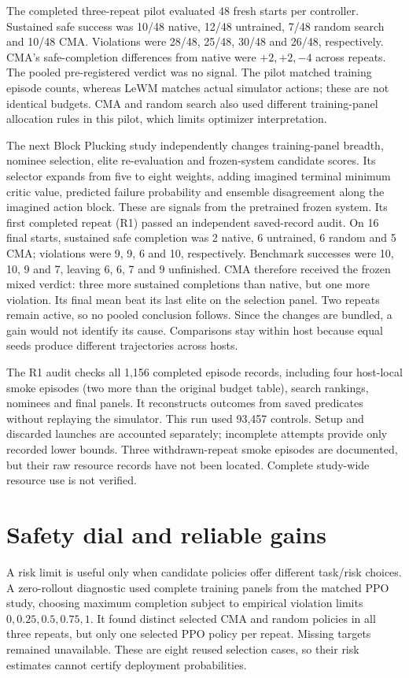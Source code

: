 \documentclass[sigconf,nonacm]{acmart}
\begin{document}
The completed three-repeat pilot evaluated 48 fresh starts per controller.
Sustained safe success was 10/48 native, 12/48 untrained, 7/48 random search and
10/48 CMA. Violations were 28/48, 25/48, 30/48 and 26/48, respectively. CMA's
safe-completion differences from native were $+2,+2,-4$ across repeats. The pooled
pre-registered verdict was no signal. The pilot matched training episode counts,
whereas LeWM matches actual simulator actions; these are not identical budgets.
CMA and random search also used different training-panel allocation rules in this
pilot, which limits optimizer interpretation.

The next Block Plucking study independently changes training-panel breadth,
nominee selection, elite re-evaluation and frozen-system candidate scores. Its
selector expands from five to eight weights, adding imagined terminal minimum
critic value, predicted failure probability and ensemble disagreement along the
imagined action block. These are signals from the pretrained frozen system.
Its
first completed repeat (R1) passed an independent saved-record audit. On 16 final
starts, sustained safe completion was 2 native, 6 untrained, 6 random and 5 CMA;
violations were 9, 9, 6 and 10, respectively. Benchmark successes were 10, 10, 9
and 7, leaving 6, 6, 7 and 9 unfinished. CMA therefore received the frozen mixed
verdict: three more sustained completions than native, but one more violation.
Its final mean beat its last elite on the selection panel. Two repeats remain
active, so no pooled conclusion follows. Since the changes are bundled, a gain
would not identify its cause. Comparisons stay within host because equal seeds
produce different trajectories across hosts.

The R1 audit checks all 1,156 completed episode records, including four host-local
smoke episodes (two more than the original budget table), search rankings, nominees
and final panels. It reconstructs outcomes from saved predicates without replaying
the simulator. This run used 93,457 controls. Setup and discarded launches are
accounted separately; incomplete attempts provide only recorded lower bounds.
Three withdrawn-repeat smoke episodes are documented, but their raw resource
records have not been located. Complete study-wide resource use is not verified.

\section{Safety dial and reliable gains}
A risk limit is useful only when candidate policies offer different task/risk
choices. A zero-rollout diagnostic used complete training panels from the matched
PPO study, choosing maximum completion subject to empirical violation limits
$0,0.25,0.5,0.75,1$. It found distinct selected CMA and random policies in all three
repeats, but only one selected PPO policy per repeat. Missing targets remained
unavailable. These are eight reused selection cases, so their risk estimates
cannot certify deployment probabilities.
\end{document}
